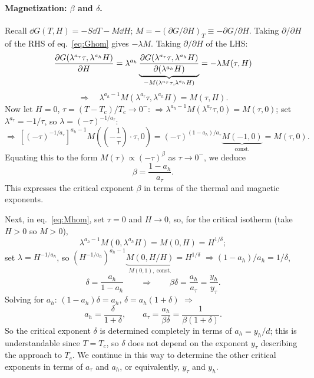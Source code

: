 \paragraph{Magnetization: $\beta$ and $\delta$.} Recall $\dd G(T,H) = -S\dd T - M\dd H$;
$M = -(\partial G/\partial H)_T\equiv-\partial G/\partial H$. Taking $\partial/\partial H$ of the RHS of
eq.~\eqref{eq:Ghom} gives $-\lambda M$. Taking $\partial/\partial H$ of the LHS:
\begin{equation}
  \frac{\partial G(\lambda^{a_\tau}\tau,\lambda^{a_h}H)}{\partial H}
  = \lambda^{a_h}\underbrace{\frac{\partial G(\lambda^{a_\tau}\tau,\lambda^{a_h}H)}{\partial(\lambda^{a_h}H)}}_{-M(\lambda^{a_\tau}\tau,\lambda^{a_h}H)}
  = -\lambda M(\tau,H)
\end{equation}
\begin{equation}\label{eq:Mhom}
  \Rightarrow\quad\boxed{\lambda^{a_h-1}M(\lambda^{a_\tau}\tau,\lambda^{a_h}H) = M(\tau,H)}.
\end{equation}
Now let $H = 0$, $\tau = (T-T_c)/T_c\to 0^-$:
$\Rightarrow\lambda^{a_h-1}M(\lambda^{a_\tau}\tau,0) = M(\tau,0)$; set $\lambda^{a_\tau} = -1/\tau$, so
$\lambda = (-\tau)^{-1/a_\tau}$:
\begin{equation}
  \Rightarrow\ \left[(-\tau)^{-1/a_\tau}\right]^{a_h-1}M\left(\left(-\frac{1}{\tau}\right)\cdot\tau,0\right)
  = (-\tau)^{(1-a_h)/a_\tau}\underbrace{M(-1,0)}_{\text{const.}} = M(\tau,0).
\end{equation}
Equating this to the form $M(\tau)\propto(-\tau)^\beta$ as $\tau\to 0^-$, we deduce
\begin{equation}
  \boxed{\beta = \frac{1-a_h}{a_\tau}}.
\end{equation}
This expresses the critical exponent $\beta$ in terms of the thermal and magnetic exponents.

Next, in eq.~\eqref{eq:Mhom}, set $\tau = 0$ and $H\to 0$, so, for the critical isotherm (take $H>0$ so
$M>0$),
\begin{equation}
  \lambda^{a_h-1}M(0,\lambda^{a_h}H) = M(0,H) = H^{1/\delta};
\end{equation}
set $\lambda = H^{-1/a_h}$, so
$(H^{-1/a_h})^{a_h-1}\underbrace{M(0,H/H)}_{M(0,1),\ \text{const.}} = H^{1/\delta}$
$\Rightarrow(1-a_h)/a_h = 1/\delta$,
\begin{equation}
  \boxed{\delta = \frac{a_h}{1-a_h}}
  \qquad\Rightarrow\qquad
  \boxed{\beta\delta = \frac{a_h}{a_\tau} = \frac{y_h}{y_\tau}}.
\end{equation}
Solving for $a_h$: $(1-a_h)\delta = a_h$, $\delta = a_h(1+\delta)$ $\Rightarrow$
\begin{equation}
  \boxed{a_h = \frac{\delta}{1+\delta},\qquad a_\tau = \frac{a_h}{\beta\delta} = \frac{1}{\beta(1+\delta)}}.
\end{equation}
So the critical exponent $\delta$ is determined completely in terms of $a_h = y_h/d$; this is
understandable since $T = T_c$, so $\delta$ does not depend on the exponent $y_\tau$ describing the
approach to $T_c$. We continue in this way to determine the other critical exponents in terms of
$a_\tau$ and $a_h$, or equivalently, $y_\tau$ and $y_h$.

